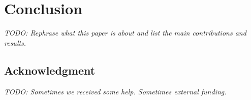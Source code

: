 \documentclass[a4paper,fontsize=10pt,twoside,DIV15,BCOR12mm,headinclude=true,footinclude=false,pagesize,bibtotoc]{scrbook}
\newcommand{\todo}[1]{{\emph{TODO: #1}}}
\begin{document}
\section{Conclusion}
\label{sec:conclusion}

\todo{Rephrase what this paper is about and list the main contributions and results.}

\subsection*{Acknowledgment}

\todo{Sometimes we received some help. Sometimes external funding.}





\end{document}
